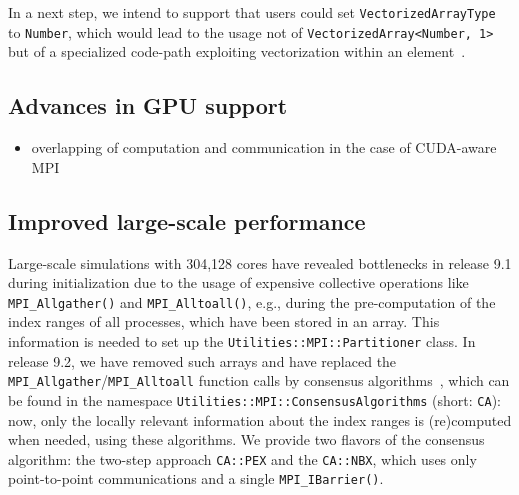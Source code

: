 \documentclass{ansarticle-preprint}
\begin{document}
In a next step, we intend to support that users could set 
\texttt{VectorizedArrayType} to \texttt{Number}, which would lead to the usage not 
of \texttt{VectorizedArray<Number, 1>} but of a specialized code-path exploiting 
vectorization within an element~\cite{KronbichlerKormann2019}.

\subsection{Advances in GPU support}
\label{subsec:gpu}

\begin{itemize}
\item overlapping of computation and communication in the case of CUDA-aware MPI
\end{itemize}


\subsection{Improved large-scale performance}
\label{subsec:performance}

Large-scale simulations with 304,128 cores have revealed bottlenecks in release 
9.1 during initialization due to the usage of expensive collective operations 
like \texttt{MPI\_Allgather()} and \texttt{MPI\_\allowbreak Alltoall()}, e.g., during the 
pre-computation of the index ranges of all processes, which have been stored in  an array. 
This information is needed to set up 
the  \texttt{Utilities::MPI::Par\-ti\-ti\-oner} class. 
In release 9.2, we have removed such arrays and have replaced 
the \texttt{MPI\_Allgather}/\allowbreak\texttt{MPI\_\allowbreak Alltoall} 
function calls by consensus algorithms~\cite{hoefler2010scalable}, which can be 
found in the namespace \texttt{Utilities::\allowbreak MPI::\allowbreak ConsensusAlgorithms} (short: \texttt{CA}): now, only the locally relevant information about the index ranges is (re)computed when needed, using these algorithms. 
We provide two flavors of the consensus algorithm: the two-step 
approach \texttt{CA::PEX} and the \texttt{CA::NBX}, 
which uses only point-to-point communications and a single \texttt{MPI\_IBarrier()}.

\end{document}
